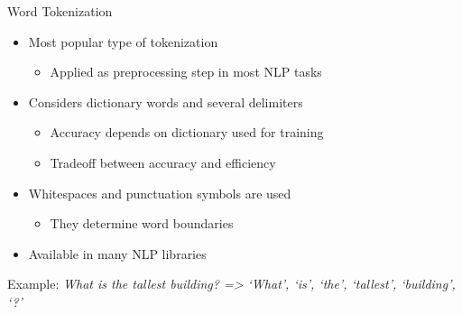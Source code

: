 \documentclass[11pt,compress,t,notes=noshow, xcolor=table]{beamer}
\begin{document}
\begin{vbframe}{Word Tokenization}

\vfill

\begin{itemize}
	\item Most popular type of tokenization
		\begin{itemize}
			\item Applied as preprocessing step in most NLP tasks
		\end{itemize}
	\item Considers dictionary words and several delimiters
		\begin{itemize}
			\item Accuracy depends on dictionary used for training
			\item Tradeoff between accuracy and efficiency
		\end{itemize}
	\item Whitespaces and punctuation symbols are used 
		\begin{itemize}
			\item They determine word boundaries
		\end{itemize}
	\item Available in many NLP libraries
\end{itemize}

\vskip5mm
Example: \vskip3mm 
{\small\it What is the tallest building? => `What', `is', `the', `tallest', `building', `?'}

\vfill

\end{vbframe}

\end{document}
